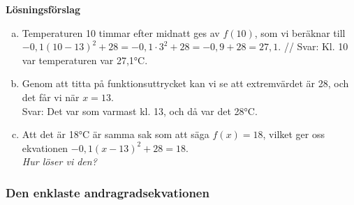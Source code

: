 \textbf{Lösningsförslag}
\begin{enumerate}[(a)]
  \item Temperaturen 10 timmar efter midnatt ges av $f(10)$, som vi beräknar till $-0,1(10-13)^2+28 = -0,1 \cdot 3^2 + 28 = -0,9+28 = 27,1$. //
  Svar: Kl. 10 var temperaturen var 27,1°C.
  \item Genom att titta på funktionsuttrycket kan vi se att extremvärdet är 28, och det får vi när $x=13$. \\
  Svar: Det var som varmast kl. 13, och då var det 28°C.
  \item Att det är 18°C är samma sak som att säga $f(x)=18$, vilket ger oss ekvationen $-0,1(x-13)^2+28=18$. \\
  \emph{Hur löser vi den?}
\end{enumerate}

\subsubsection{Den enklaste andragradsekvationen}


